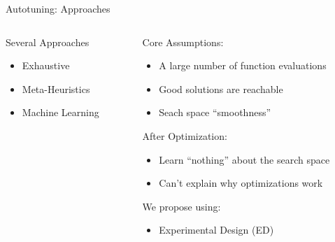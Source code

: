 \documentclass[10pt, compress, aspectratio=169, xcolor={table,usenames,dvipsnames}]{beamer}
\begin{document}
\begin{frame}[label={sec:org63fe464}]{Autotuning: Approaches}
\begin{columns}
\begin{column}{0.5\columnwidth}
\begin{block}{Several Approaches}
\footnotesize
\begin{itemize}
\item \colorbox{red!25}{Exhaustive}
\item \colorbox{green!25}{Meta-Heuristics}
\item \colorbox{cyan!25}{Machine Learning}
\end{itemize}
\normalsize

\vspace{-.4cm}


\end{block}
\end{column}

\begin{column}{0.5\columnwidth}
\begin{block}{Core Assumptions:}
\begin{itemize}
\item A large number of function evaluations
\item Good solutions are reachable
\item Seach space ``smoothness''
\end{itemize}
\begin{block}{After Optimization:}
\begin{itemize}
\item \alert{Learn ``nothing''} about the search space
\item \alert{Can't explain} why optimizations work
\end{itemize}
\end{block}
\begin{block}{We propose using:}
\begin{itemize}
\item \alert{Experimental Design} (\alert{ED})
\end{itemize}
\end{block}
\end{block}
\end{column}
\end{columns}
\end{frame}
\end{document}

